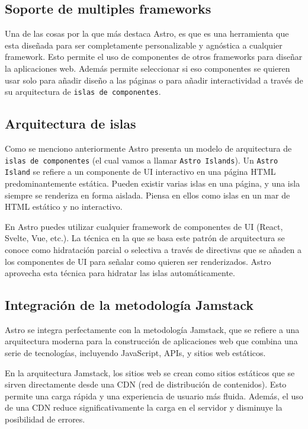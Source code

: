 \subsection{Soporte de multiples frameworks}
Una de las cosas por la que más destaca Astro, es que es una herramienta que esta diseñada para ser completamente personalizable y agnóstica a cualquier framework. Esto permite el uso de componentes de otros frameworks para diseñar la aplicaciones web. Además permite seleccionar si eso componentes se quieren usar solo para añadir diseño a las páginas o para añadir interactividad a través de su arquitectura de \verb|islas de componentes|\cite{astro-islands}.

\subsection{Arquitectura de islas}
Como se menciono anteriormente Astro presenta un modelo de arquitectura de \verb|islas de componentes| \cite{astro-islands} (el cual vamos a llamar \verb|Astro Islands|). Un \verb|Astro Island| se refiere a un componente de UI interactivo en una página HTML predominantemente estática. Pueden existir varias islas en una página, y una isla siempre se renderiza en forma aislada. Piensa en ellos como islas en un mar de HTML estático y no interactivo.

En Astro puedes utilizar cualquier framework de componentes de UI (React, Svelte, Vue, etc.). La técnica en la que se basa este patrón de arquitectura se conoce como hidratación parcial o selectiva a través de directivas que se añaden a los componentes de UI para señalar como quieren ser renderizados. Astro aprovecha esta técnica para hidratar las islas automáticamente.

\subsection{Integración de la metodología Jamstack}
Astro se integra perfectamente con la metodología Jamstack, que se refiere a una arquitectura moderna para la construcción de aplicaciones web que combina una serie de tecnologías, incluyendo JavaScript, APIs, y sitios web estáticos.

En la arquitectura Jamstack, los sitios web se crean como sitios estáticos que se sirven directamente desde una CDN (red de distribución de contenidos). Esto permite una carga rápida y una experiencia de usuario más fluida. Además, el uso de una CDN reduce significativamente la carga en el servidor y disminuye la posibilidad de errores.

